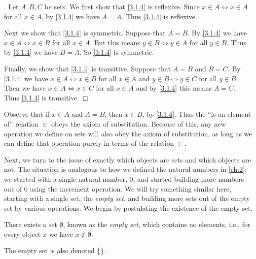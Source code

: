 \begin{proof}[]
  Let \(A, B, C\) be sets.
  We first show that \cref{3.1.4} is reflexive.
  Since \(x \in A \iff x \in A\) for all \(x \in A\), by \cref{3.1.4} we have \(A = A\).
  Thus \cref{3.1.4} is reflexive.

  Next we show that \cref{3.1.4} is symmetric.
  Suppose that \(A = B\).
  By \cref{3.1.4} we have \(x \in A \iff x \in B\) for all \(x \in A\).
  But this means \(y \in B \iff y \in A\) for all \(y \in B\).
  Thus by \cref{3.1.4} we have \(B = A\).
  So \cref{3.1.4} is symmetric.

  Finally, we show that \cref{3.1.4} is transitive.
  Suppose that \(A = B\) and \(B = C\).
  By \cref{3.1.4} we have \(x \in A \iff x \in B\) for all \(x \in A\) and \(y \in B \iff y \in C\) for all \(y \in B\).
  Then we have \(x \in A \iff x \in C\) for all \(x \in A\) and by \cref{3.1.4} this means \(A = C\).
  Thus \cref{3.1.4} is transitive.
\end{proof}

\begin{note}
  Observe that if \(x \in A\) and \(A = B\), then \(x \in B\), by \cref{3.1.4}.
  Thus the ``is an element of'' relation \(\in\) obeys the axiom of substitution.
  Because of this, any new operation we define on sets will also obey the axiom of substitution, as long as we can define that operation purely in terms of the relation \(\in\).
\end{note}

\begin{note}
  Next, we turn to the issue of exactly which objects are sets and which objects are not.
  The situation is analogous to how we defined the natural numbers in \cref{ch:2};
  we started with a single natural number, \(0\), and started building more numbers out of \(0\) using the increment operation.
  We will try something similar here, starting with a single set, the \emph{empty set},
  and building more sets out of the empty set by various operations.
  We begin by postulating the existence of the empty set.
\end{note}

\begin{ax}\label{3.2}
  There exists a set \(\emptyset\), known as the \emph{empty set}, which contains no elements, i.e., for every object \(x\) we have \(x \notin \emptyset\).
\end{ax}

\begin{note}
  The empty set is also denoted \(\left\lbrace\right\rbrace\).
\end{note}


